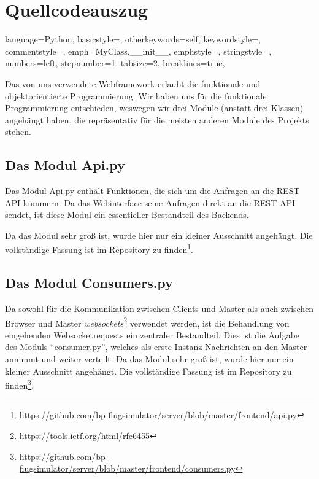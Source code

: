 \section{Quellcodeauszug}


\lstset
{
    language=Python,
    basicstyle=\footnotesize,
    otherkeywords={self},             %
    keywordstyle=\color{deepblue},
    commentstyle=\color{string-color},
    emph={MyClass,__init__},          %
    emphstyle=\color{deepred},    %
    stringstyle=\color{deepgreen},
    numbers=left,
    stepnumber=1,
    tabsize=2,
    breaklines=true,
}

Das von uns verwendete Webframework erlaubt die funktionale und objektorientierte Programmierung. Wir haben uns für die funktionale Programmierung
entschieden, weswegen wir drei Module (anstatt drei Klassen) angehängt haben, die repräsentativ für die meisten
anderen Module des Projekts stehen.

\subsection{Das Modul Api.py}
Das Modul Api.py enthält Funktionen, die sich um die Anfragen an die REST API kümmern.
Da das Webinterface seine Anfragen direkt an die REST API sendet, ist diese Modul ein essentieller
Bestandteil des Backends.

Da das Modul sehr groß ist, wurde hier nur ein kleiner Ausschnitt angehängt.
Die vollständige Fassung ist im Repository zu finden\footnote{\url{https://github.com/bp-flugsimulator/server/blob/master/frontend/api.py}}.


\subsection{Das Modul Consumers.py}
Da sowohl für die Kommunikation zwischen Clients und Master als auch zwischen Browser und
Master \textit{websockets}\footnote{\url{https://tools.ietf.org/html/rfc6455}} verwendet werden,
ist die Behandlung von eingehenden Websocketrequests ein zentraler Bestandteil. Dies ist die
Aufgabe des Moduls "`consumer.py"', welches als erste Instanz Nachrichten an den Master annimmt und
weiter verteilt.
Da das Modul sehr groß ist, wurde hier nur ein kleiner Ausschnitt angehängt.
Die vollständige Fassung ist im Repository zu finden\footnote{\url{https://github.com/bp-flugsimulator/server/blob/master/frontend/consumers.py}}.

